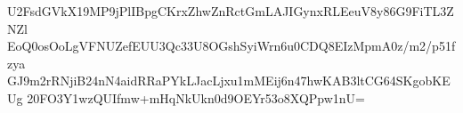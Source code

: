 U2FsdGVkX19MP9jPlIBpgCKrxZhwZnRctGmLAJIGynxRLEeuV8y86G9FiTL3ZNZl
EoQ0osOoLgVFNUZefEUU3Qc33U8OGshSyiWrn6u0CDQ8EIzMpmA0z/m2/p51fzya
GJ9m2rRNjiB24nN4aidRRaPYkLJacLjxu1mMEij6n47hwKAB3ltCG64SKgobKEUg
20FO3Y1wzQUIfmw+mHqNkUkn0d9OEYr53o8XQPpw1nU=
